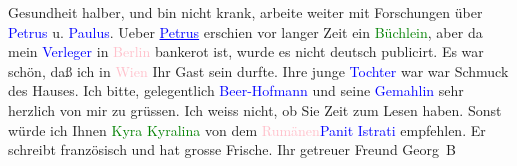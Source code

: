                     Gesundheit halber, und bin nicht krank, arbeite weiter mit Forschungen über \textcolor{blue}{Petrus}{}\ledrightnote{\textcolor{blue}{Simon Petrus}} u. \textcolor{blue}{Paulus}{}\ledrightnote{\textcolor{blue}{Paulus}}. Ueber \textcolor{blue}{\uline{Petrus}}{}\ledrightnote{\textcolor{blue}{Simon Petrus}} erschien vor langer Zeit ein \textcolor{green}{Büchlein}{}, aber da mein \textcolor{blue}{Verleger}{} in \textcolor{pink}{Berlin}{}\ledrightnote{\textcolor{pink}{Berlin}}
                    bankerot ist, wurde es nicht deutsch publicirt.\pend
           \pstart
           Es war schön, daß ich in \textcolor{pink}{Wien}{}\ledrightnote{\textcolor{pink}{Wien}} Ihr Gast sein
                    durfte. Ihre junge \textcolor{blue}{Tochter}{}
                    war {\pb}war Schmuck des
                    Hauses.\pend
           \pstart
           Ich bitte, gelegentlich \textcolor{blue}{Beer-Hofmann}{}\ledrightnote{\textcolor{blue}{Richard Beer-Hofmann}} und
                    seine \textcolor{blue}{Gemahlin}{} sehr
                    herzlich von mir zu grüssen.\pend
           \pstart
           Ich weiss nicht, ob Sie Zeit zum Lesen haben. Sonst würde ich Ihnen \textcolor{green}{Kyra Kyralina}{}\ledrightnote{\textcolor{green}{Kyra Kyralina}} von dem \textcolor{pink}{Rumänen}{}\ledrightnote{\textcolor{pink}{Rumänien}}{ }\textcolor{blue}{Panit Istrati}{}\ledrightnote{\textcolor{blue}{Panaït Istrati}} empfehlen. Er schreibt
                    französisch und hat grosse Frische.\pend
           \pstart Ihr getreuer Freund \spacefill\mbox{Georg B}\pend{}\endnumbering{}  
      